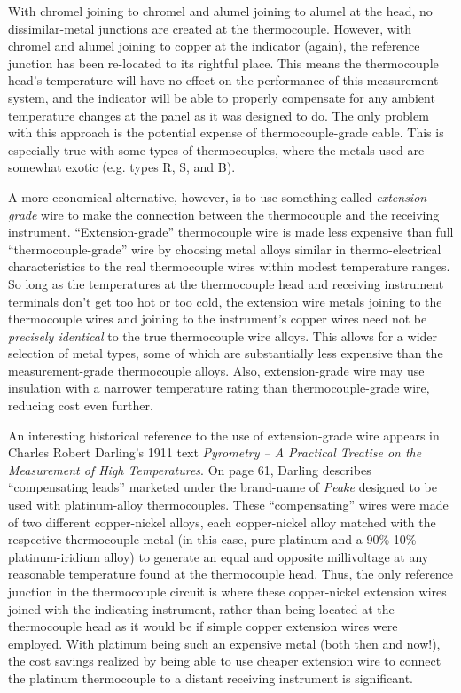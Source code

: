 With chromel joining to chromel and alumel joining to alumel at the head, no dissimilar-metal junctions are created at the thermocouple.  However, with chromel and alumel joining to copper at the indicator (again), the reference junction has been re-located to its rightful place.  This means the thermocouple head's temperature will have no effect on the performance of this measurement system, and the indicator will be able to properly compensate for any ambient temperature changes at the panel as it was designed to do.  The only problem with this approach is the potential expense of thermocouple-grade cable.  This is especially true with some types of thermocouples, where the metals used are somewhat exotic (e.g. types R, S, and B).  

A more economical alternative, however, is to use something called \textit{extension-grade} wire to make the connection between the thermocouple and the receiving instrument.  ``Extension-grade'' thermocouple wire is made less expensive than full ``thermocouple-grade'' wire by choosing metal alloys similar in thermo-electrical characteristics to the real thermocouple wires within modest temperature ranges.  So long as the temperatures at the thermocouple head and receiving instrument terminals don't get too hot or too cold, the extension wire metals joining to the thermocouple wires and joining to the instrument's copper wires need not be \textit{precisely identical} to the true thermocouple wire alloys.  This allows for a wider selection of metal types, some of which are substantially less expensive than the measurement-grade thermocouple alloys.  Also, extension-grade wire may use insulation with a narrower temperature rating than thermocouple-grade wire, reducing cost even further.  

An interesting historical reference to the use of extension-grade wire appears in Charles Robert Darling's 1911 text \textit{Pyrometry -- A Practical Treatise on the Measurement of High Temperatures}.  On page 61, Darling describes ``compensating leads'' marketed under the brand-name of \textit{Peake} designed to be used with platinum-alloy thermocouples.  These ``compensating'' wires were made of two different copper-nickel alloys, each copper-nickel alloy matched with the respective thermocouple metal (in this case, pure platinum and a 90\%-10\% platinum-iridium alloy) to generate an equal and opposite millivoltage at any reasonable temperature found at the thermocouple head.  Thus, the only reference junction in the thermocouple circuit is where these copper-nickel extension wires joined with the indicating instrument, rather than being located at the thermocouple head as it would be if simple copper extension wires were employed.  With platinum being such an expensive metal (both then and now!), the cost savings realized by being able to use cheaper extension wire to connect the platinum thermocouple to a distant receiving instrument is significant.

